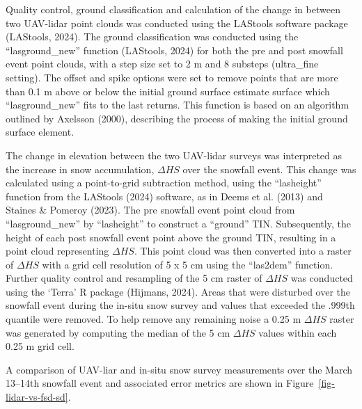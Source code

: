 \documentclass[
  letterpaper,
  DIV=11,
  numbers=noendperiod]{scrartcl}
\begin{document}
Quality control, ground classification and calculation of the change in
between two UAV-lidar point clouds was conducted using the LAStools
software package (LAStools, 2024). The ground classification was
conducted using the ``lasground\_new'' function (LAStools, 2024) for
both the pre and post snowfall event point clouds, with a step size set
to 2 m and 8 substeps (ultra\_fine setting). The offset and spike
options were set to remove points that are more than 0.1 m above or
below the initial ground surface estimate surface which
``lasground\_new'' fits to the last returns. This function is based on
an algorithm outlined by Axelsson (2000), describing the process of
making the initial ground surface element.

The change in elevation between the two UAV-lidar surveys was
interpreted as the increase in snow accumulation, \(\Delta HS\) over the
snowfall event. This change was calculated using a point-to-grid
subtraction method, using the ``lasheight'' function from the LAStools
(2024) software, as in Deems et al. (2013) and Staines \& Pomeroy
(2023). The pre snowfall event point cloud from ``lasground\_new'' by
``lasheight'' to construct a ``ground'' TIN. Subsequently, the height of
each post snowfall event point above the ground TIN, resulting in a
point cloud representing \(\Delta HS\). This point cloud was then
converted into a raster of \(\Delta HS\) with a grid cell resolution of
5 x 5 cm using the ``las2dem'' function. Further quality control and
resampling of the 5 cm raster of \(\Delta HS\) was conducted using the
`Terra' R package (Hijmans, 2024). Areas that were disturbed over the
snowfall event during the in-situ snow survey and values that exceeded
the .999th quantile were removed. To help remove any remaining noise a
0.25 m \(\Delta HS\) raster was generated by computing the median of the
5 cm \(\Delta HS\) values within each 0.25 m grid cell.

A comparison of UAV-liar and in-situ snow survey measurements over the
March 13--14th snowfall event and associated error metrics are shown in
Figure~\ref{fig-lidar-vs-fsd-sd}.
\end{document}
